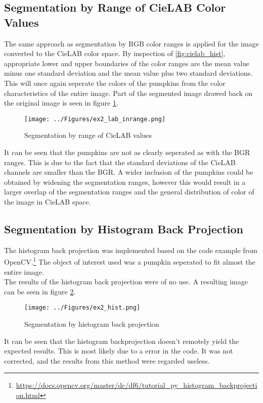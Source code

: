 \documentclass[../Head/Main.tex]{subfiles}
\begin{document}
\subsection{Segmentation by Range of CieLAB Color Values}
The same approach as segmentation by RGB color ranges is applied for the image converted to the CieLAB color space. By inspection of \ref{fig:cielab_hist}, appropriate lower and upper boundaries of the color ranges are the mean value minus one standard deviation and the mean value plus two standard deviations. This will once again seperate the colors of the pumpkins from the color characteristics of the entire image. Part of the segmented image drawed back on the original image is seen in figure \ref{fig:labSeg}.

\begin{figure}[H]
\centering
\texttt{[image: ../Figures/ex2\_lab\_inrange.png]}
\caption{Segmentation by range of CieLAB values}
\label{fig:labSeg}
\end{figure}

It can be seen that the pumpkins are not as clearly seperated as with the BGR ranges. This is due to the fact that the standard deviations of the CieLAB channels are smaller than the BGR. A wider inclusion of the pumpkins could be obtained by widening the segmentation ranges, however this would result in a larger overlap of the segmentation ranges and the general distribution of color of the image in CieLAB space.

\subsection{Segmentation by Histogram Back Projection}
The histogram back projection was implemented based on the code example from OpenCV.\footnote{\url{https://docs.opencv.org/master/dc/df6/tutorial_py_histogram_backprojection.html}} The object of interest used was a pumpkin seperated to fit almost the entire image.\\
The results of the histogram back projection were of no use. A resulting image can be seen in figure \ref{fig:histSeg}.

\begin{figure}[H]
\centering
\texttt{[image: ../Figures/ex2\_hist.png]}
\caption{Segmentation by histogram back projection}
\label{fig:histSeg}
\end{figure}

It can be seen that the histogram backprojection doesn't remotely yield the expected results. This is most likely due to a error in the code. It was not corrected, and the results from this method were regarded useless.
\end{document}
